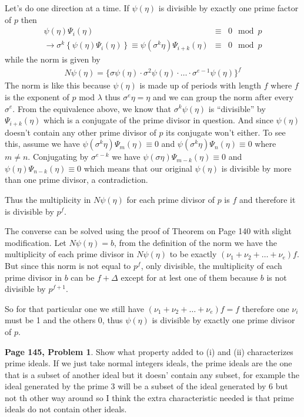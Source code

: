 \documentclass[aps,preprint,preprintnumbers,nofootinbib,showpacs,prd]{revtex4-1}
\newcommand{\nbea}{\begin{eqnarray*}}
\newcommand{\neea}{\end{eqnarray*}}
\begin{document}
Let's do one direction at a time. If $\psi(\eta)$ is divisible by exactly one prime factor of $p$ then
%
\nbea
\psi(\eta) \Psi_i(\eta) & \equiv & 0 \mod p \\
\to \sigma^k \left \{\psi(\eta) \Psi_i(\eta) \right \} \equiv \psi(\sigma^k\eta) \Psi_{i + k}(\eta)  & \equiv & 0 \mod p 
\neea
%
while the norm is given by
%
\nbea
N\psi(\eta) = \{\sigma \psi(\eta) \cdot \sigma^2 \psi(\eta) \cdot \dots \cdot \sigma^{e - 1} \psi(\eta)\}^f
\neea
%
The norm is like this because $\psi(\eta)$ is made up of periods with length $f$ where $f$ is the exponent of $p$ mod $\lambda$ thus $\sigma^e \eta = \eta$ and we can group the norm after every $\sigma^e$. From the equivalence above, we know that $\sigma^k \psi(\eta)$ is ``divisible'' by $\Psi_{i + k}(\eta)$ which is a conjugate of the prime divisor in question. And since $\psi(\eta)$ doesn't contain any other prime divisor of $p$ its conjugate won't either. To see this, assume we have $\psi(\sigma^k \eta)\Psi_{m}(\eta) \equiv 0$ and $\psi(\sigma^k \eta)\Psi_{n}(\eta) \equiv 0$ where $m \neq n$. Conjugating by $\sigma^{e - k}$ we have $\psi(\sigma \eta)\Psi_{m - k}(\eta) \equiv 0$ and $\psi(\eta)\Psi_{n-k}(\eta) \equiv 0$ which means that our original $\psi(\eta)$ is divisible by more than one prime divisor, a contradiction.

Thus the multiplicity in $N\psi(\eta)$ for each prime divisor of $p$ is $f$ and therefore it is divisible by $p^f$.

The converse can be solved using the proof of Theorem on Page 140 with slight modification. Let $N\psi(\eta) = b$, from the definition of the norm we have the multiplicity of each prime divisor in $N\psi(\eta)$ to be exactly $(\nu_1 + \nu_2 + \dots + \nu_e)f$. But since this norm is not equal to $p^f$, only divisible, the multiplicity of each prime divisor in $b$ can be $f + \Delta$ except for at lest one of them because $b$ is not divisible by $p^{f+1}$.

So for that particular one we still have $(\nu_1 + \nu_2 + \dots + \nu_e)f = f$ therefore one $\nu_i$ must be 1 and the others 0, thus $\psi(\eta)$ is divisible by exactly one prime divisor of $p$.








{\bf Page 145, Problem 1}. Show what property added to (i) and (ii) characterizes prime ideals. If we just take normal integers ideals, the prime ideals are the one that is a subset of another ideal but it doesn' contain any subset, for example the ideal generated by the prime 3 will be a subset of the ideal generated by 6 but not th other way around so I think the extra characteristic needed is that prime ideals do not contain other ideals.
\end{document}
